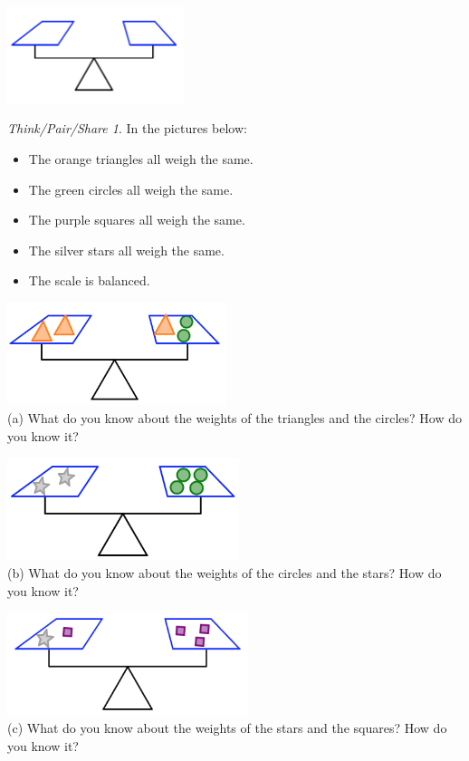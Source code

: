 \documentclass[12pt, reqno]{amsart}
\theoremstyle{remark}
\newtheorem*{thinkpair*}{Think/Pair/Share}
\theoremstyle{definition}
\numberwithin{equation}{section}  %
\begin{document}
\begin{center}
\includegraphics[height=2.8cm]{emptyscale}
\end{center}

\bigskip


\begin{thinkpair*}
In the pictures below:
\begin{itemize}
\item
The orange triangles all weigh the same.  
\item
The green circles all weigh the same.  
\item
The purple squares all weigh the same.  
\item
The silver stars all weigh the same.
\item
The scale is balanced.
\end{itemize}

\begin{center}
\includegraphics[height=3cm]{balancetalk1}\\
(a) What do you know about the weights of the triangles and the circles?  How do you know it?

\bigskip

\includegraphics[height=3cm]{balancetalk2}\\
(b) What do you know about the weights of the circles and the stars?  How do you know it?

\bigskip

\includegraphics[height=3cm]{balancetalk3}\\
(c) What do you know about the weights of the stars and the squares?  How do you know it?


\end{center}



\end{thinkpair*}
\end{document}
